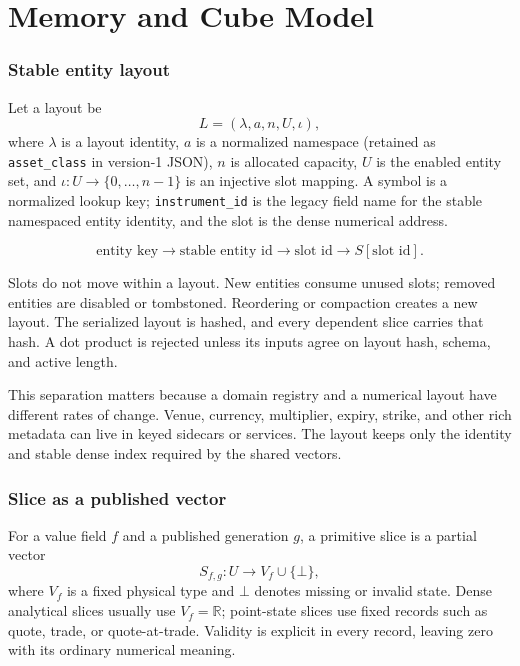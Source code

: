 \documentclass{strategynet-journal}
\newcommand{\R}{\mathbb{R}}
\begin{document}
\clearpage
\part{Memory and Cube Model}

\section{Stable entity layout}

\begin{SNcolumns}

Let a layout be
\[
  L=(\lambda,a,n,U,\iota),
\]
where \(\lambda\) is a layout identity, \(a\) is a normalized namespace
(retained as \texttt{asset\_class} in version-1 JSON), \(n\) is allocated
capacity, \(U\) is the enabled entity set, and
\(\iota:U\rightarrow\{0,\ldots,n-1\}\) is an injective slot mapping.  A symbol
is a normalized lookup key; \texttt{instrument\_id} is the legacy field name
for the stable namespaced entity identity, and the slot is the dense numerical
address.

\[
  \text{entity key}\longrightarrow\text{stable entity id}
  \longrightarrow\text{slot id}\longrightarrow S[\text{slot id}].
\]

Slots do not move within a layout.  New entities consume unused slots;
removed entities are disabled or tombstoned.  Reordering or compaction
creates a new layout.  The serialized layout is hashed, and every dependent
slice carries that hash.  A dot product is rejected unless its inputs agree on
layout hash, schema, and active length.

This separation matters because a domain registry and a numerical layout
have different rates of change.  Venue, currency, multiplier, expiry, strike,
and other rich metadata can live in keyed sidecars or services.  The layout
keeps only the identity and stable dense index required by the shared vectors.

\end{SNcolumns}

\section{Slice as a published vector}

For a value field \(f\) and a published generation \(g\), a primitive slice is
a partial vector
\[
  S_{f,g}:U\rightarrow V_f\cup\{\bot\},
\]
where \(V_f\) is a fixed physical type and \(\bot\) denotes missing or invalid
state.  Dense analytical slices usually use \(V_f=\R\); point-state slices use
fixed records such as quote, trade, or quote-at-trade.  Validity is explicit
in every record, leaving zero with its ordinary numerical meaning.
\end{document}
